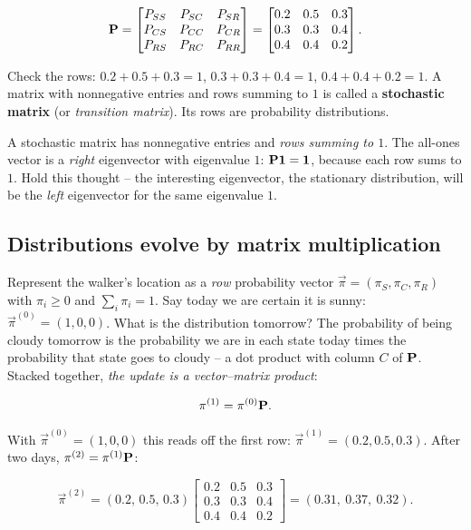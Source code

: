 \[
\mathbf{P} =
\begin{bmatrix}
P_{SS} & P_{SC} & P_{SR}\\
P_{CS} & P_{CC} & P_{CR}\\
P_{RS} & P_{RC} & P_{RR}
\end{bmatrix}
=
\begin{bmatrix}
0.2 & 0.5 & 0.3\\
0.3 & 0.3 & 0.4\\
0.4 & 0.4 & 0.2
\end{bmatrix}.
\]

Check the rows: $0.2+0.5+0.3 = 1$, $0.3+0.3+0.4=1$, $0.4+0.4+0.2=1$. A matrix with
nonnegative entries and rows summing to $1$ is called a \textbf{stochastic matrix} (or
\emph{transition matrix}). Its rows are probability distributions.

\begin{focusbox}
A stochastic matrix has nonnegative entries and \emph{rows summing to $1$}. The all-ones
vector is a \emph{right} eigenvector with eigenvalue $1$: $\mathbf{P}\mathbf{1} = \mathbf{1}$, because
each row sums to $1$. Hold this thought -- the interesting eigenvector, the stationary
distribution, will be the \emph{left} eigenvector for the same eigenvalue $1$.
\end{focusbox}

\subsection{Distributions evolve by matrix multiplication}

Represent the walker's location as a \emph{row} probability vector
$\vec{\pi} = (\pi_S, \pi_C, \pi_R)$ with $\pi_i \ge 0$ and $\sum_i \pi_i = 1$. Say today we
are certain it is sunny: $\vec{\pi}^{(0)} = (1,0,0)$. What is the distribution tomorrow?
The probability of being cloudy tomorrow is the probability we are in each state today times
the probability that state goes to cloudy -- a dot product with column $C$ of $\mathbf{P}$.
Stacked together, \emph{the update is a vector--matrix product}:

\[
\mathbf{\pi}^{(1)} = \mathbf{\pi}^{(0)}\mathbf{P}.
\]

With $\vec{\pi}^{(0)} = (1,0,0)$ this reads off the first row:
$\vec{\pi}^{(1)} = (0.2, 0.5, 0.3)$. After two days,
$\mathbf{\pi}^{(2)} = \mathbf{\pi}^{(1)}\mathbf{P}$:

\[
\vec{\pi}^{(2)} = (0.2,\,0.5,\,0.3)
\begin{bmatrix}
0.2 & 0.5 & 0.3\\
0.3 & 0.3 & 0.4\\
0.4 & 0.4 & 0.2
\end{bmatrix}
= (0.31,\ 0.37,\ 0.32).
\]

